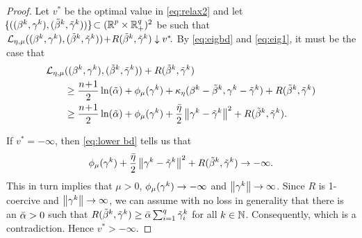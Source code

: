 \begin{proof}
Let 
\(
v^* %
\)
be the optimal value in \eqref{eq:relax2}
and let
\(
\!\{(\bgk,\tbgk)\}\!\subset (\Rp\times\Rqp)^2
\) 
be such that
\(
\LL_\emu(\bgk,\tbgk)\!+\!R\tbgk\downarrow v^*\!.
\)
By \eqref{eq:eigbd} and \eqref{eq:eig1}, 
it must be the case that 
\begin{equation}\label{eq:lower bd}
\begin{aligned}
\LL_\emu&(\bgk, \tbgk)+R\tbgk
\\ &\ge
\frac{n\!+\!1}{2}\ln(\talf)+\phimu(\gam^k)+
\keta(\beta^k-\tbeta^k,\gam^k-\tgam^k)+R\tbgk
\\ &\ge
\frac{n\!+\!1}{2}\ln(\talf)+\phimu(\gam^k)+\frac{\bar\eta}{2}\norm{\gam^k-\tgam^k}^2
+R\tbgk.
\end{aligned}
\end{equation}


If $v^*=-\infty$, then \eqref{eq:lower bd} tells us that
\begin{equation}\label{eq:minus infty1}
\phimu(\gam^k)
+\frac{\blam}{2}\norm{\gam^k-\tgam^k}^2+R\tbgk\rightarrow-\infty.
\end{equation}
This in turn implies that $\mu>0$, $\phimu(\gam^k)\rightarrow-\infty$
and $\norm{\gam^k}\rightarrow \infty$.
Since $R$ is 1-coercive and $\norm{\gam^k}\rightarrow \infty$, 
we can assume with no loss in generality that there is an $\balf>0$
such that $R\tbgk\ge \balf \sum_{i=1}^q\tgam^k_i$ for all $k\in\N$. 
Consequently,
which is a contradiction. Hence $v^*>-\infty$.


\end{proof}
